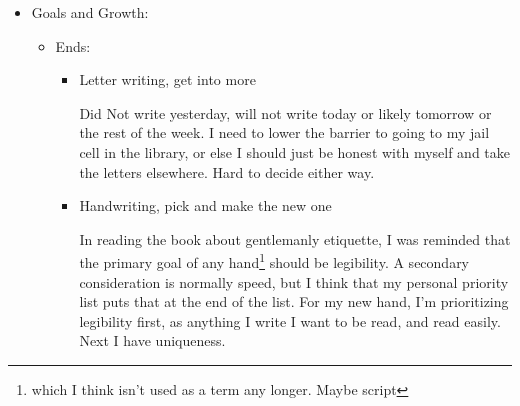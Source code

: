 \documentclass[12pt]{article}
\renewcommand{\,}{\textsuperscript{,}}
\begin{document}
\begin{itemize}
\begin{itemize}
\begin{itemize}
I did kind of ok with this yesterday, other than the time period where I left my water at primary location and moved to secondary.  
Stretching, generally not as much as I'd like.

\item Posture

So I have realized that I instinctively cross my legs, which is weird, and a habit I think that I would like to break.  
I catch myself doing it so often, though.  
Even lying in bed, my right foot goes over the left.

\item No wasted time

Generally decently, although I did spend a while yesterday looking for pen ink, I enjoy writing enough that I'm willing to call that time decently, if not well, spent.

\item Eat more than 2 meals a day\footnote{meaning a snack and 2 meals is good or three meals, etc.}

I ate two and a bit yesterday!\footnote{rice and bratwurst and gravy for dinner, which was shockingly good. Gravy entirely because Japanese curry starts from a roux and I forgot how much I love both making and consuming roux based sauces. Lunch was a pot pie from the local gas station chain. Breakfast was a rice krispie treat and a protein bar.}

\end{itemize}

\end{itemize}

\item Goals and Growth:

\begin{itemize}

\item Ends:

\begin{itemize}

\item Letter writing, get into more

Did Not write yesterday, will not write today or likely tomorrow or the rest of the week.  
I need to lower the barrier to going to my jail cell in the library, or else I should just be honest with myself and take the letters elsewhere.  
Hard to decide either way.

\item Handwriting, pick and make the new one

In reading the book about gentlemanly etiquette, I was reminded that the primary goal of any hand\footnote{which I think isn't used as a term any longer. Maybe script} should be legibility.  
A secondary consideration is normally speed, but I think that my personal priority list puts that at the end of the list.  
For my new hand, I'm prioritizing legibility first, as anything I write I want to be read, and read easily.  
Next I have uniqueness.


\end{itemize}
\end{itemize}
\end{itemize}
\end{document}
